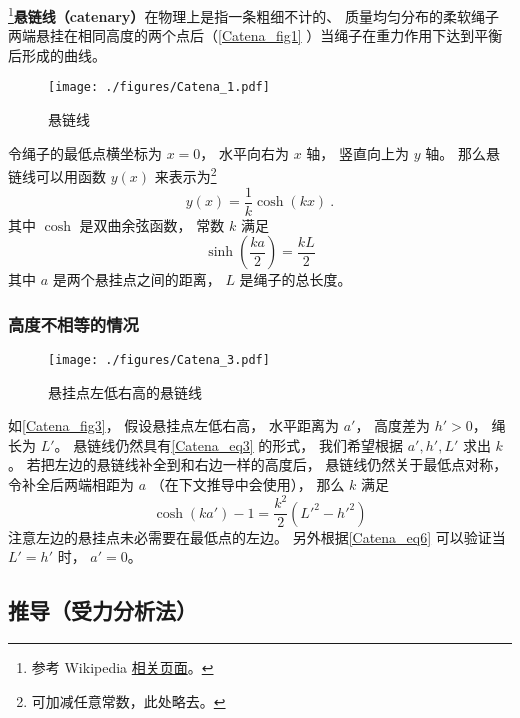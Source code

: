 

\footnote{参考 Wikipedia \href{https://en.wikipedia.org/wiki/Catenary}{相关页面}。}\textbf{悬链线（catenary）}在物理上是指一条粗细不计的、 质量均匀分布的柔软绳子两端悬挂在相同高度的两个点后（\autoref{Catena_fig1} ）当绳子在重力作用下达到平衡后形成的曲线。

\begin{figure}[ht]
\centering
\texttt{[image: ./figures/Catena\_1.pdf]}
\caption{悬链线} \label{Catena_fig1}
\end{figure}

令绳子的最低点横坐标为 $x = 0$， 水平向右为 $x$ 轴， 竖直向上为 $y$ 轴。 那么悬链线可以用函数 $y(x)$ 来表示为\footnote{可加减任意常数，此处略去。}
\begin{equation}\label{Catena_eq3}
y(x) = \frac{1}{k}\cosh(kx)~.
\end{equation}
其中 $\cosh$ 是双曲余弦函数， 常数 $k$ 满足
\begin{equation}\label{Catena_eq10}
\sinh(\frac{ka}{2}) = \frac{kL}{2}
\end{equation}
其中 $a$ 是两个悬挂点之间的距离， $L$ 是绳子的总长度。

\subsubsection{高度不相等的情况}
\begin{figure}[ht]
\centering
\texttt{[image: ./figures/Catena\_3.pdf]}
\caption{悬挂点左低右高的悬链线} \label{Catena_fig3}
\end{figure}
如\autoref{Catena_fig3}， 假设悬挂点左低右高， 水平距离为 $a'$， 高度差为 $h' > 0$， 绳长为 $L'$。 悬链线仍然具有\autoref{Catena_eq3} 的形式， 我们希望根据 $a', h', L'$ 求出 $k$。 若把左边的悬链线补全到和右边一样的高度后， 悬链线仍然关于最低点对称， 令补全后两端相距为 $a$ （在下文推导中会使用）， 那么 $k$ 满足
\begin{equation}\label{Catena_eq6}
\cosh(ka') - 1 = \frac{k^2}{2}(L'^2 - h'^2)
\end{equation}
注意左边的悬挂点未必需要在最低点的左边。 另外根据\autoref{Catena_eq6} 可以验证当 $L' = h'$ 时， $a' = 0$。

\subsection{推导（受力分析法）}

